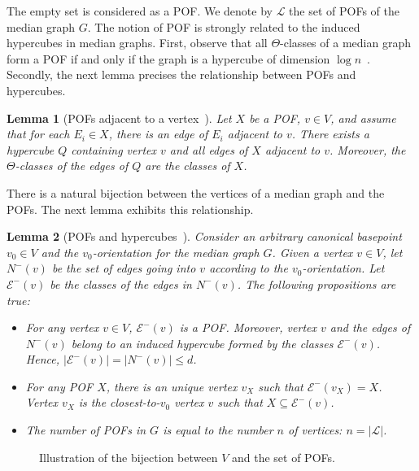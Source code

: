 \documentclass{article}
\newtheorem{lemma}{Lemma}
\newcommand{\card}[1]{\left| #1 \right|}
\begin{document}
The empty set is considered as a POF. We denote by $\mathcal{L}$ the set of POFs of the median graph $G$. The notion of POF is strongly related to the induced hypercubes in median graphs. First, observe that all $\Theta$-classes of a median graph form a POF if and only if the graph is a hypercube of dimension $\log n$~\cite{Ko09,MoMuRo98}. Secondly, the next lemma precises the relationship  between POFs and hypercubes.


\begin{lemma}[POFs adjacent to a vertex~\cite{BeHa21}]
Let $X$ be a POF, $v \in V$, and assume that for each $E_i \in X$, there is an edge of $E_i$ adjacent to $v$. There exists a hypercube $Q$ containing vertex $v$ and all edges of $X$ adjacent to $v$. Moreover, the $\Theta$-classes of the edges of $Q$ are the classes of $X$.
\label{le:pof_adjacent}
\end{lemma}

There is a natural bijection between the vertices of a median graph and the POFs. The next lemma exhibits this relationship.

\begin{lemma}[POFs and hypercubes~\cite{BaChDrKo06,BaQuSaMa02,Ko09}]
Consider an arbitrary canonical basepoint $v_0 \in V$ and the $v_0$-orientation for the median graph $G$. Given a vertex $v \in V$, let $N^-(v)$ be the set of edges going into $v$ according to the $v_0$-orientation. Let $\mathcal{E}^-(v)$ be the classes of the edges in $N^-(v)$. The following propositions are true:
\begin{itemize}
\item For any vertex $v\in V$, $\mathcal{E}^-(v)$ is a POF. Moreover, vertex $v$ and the edges of $N^-(v)$ belong to an induced hypercube formed by the classes $\mathcal{E}^-(v)$. Hence, $\card{\mathcal{E}^-(v)} = \card{N^-(v)} \le d$.
\item For any POF $X$, there is an unique vertex $v_X$ such that $\mathcal{E}^-(v_X) = X$. Vertex $v_X$ is the closest-to-$v_0$ vertex $v$ such that $X \subseteq \mathcal{E}^-(v)$.
\item The number of POFs in $G$ is equal to the number $n$ of vertices: $n = \card{\mathcal{L}}$.
\end{itemize}
\label{le:pof_hypercube}
\end{lemma}

\begin{figure}[h]
\centering
\scalebox{0.95}{}
\caption{Illustration of the bijection between $V$ and the set of POFs.}
\label{fig:vertices_pof}
\end{figure}
\end{document}
